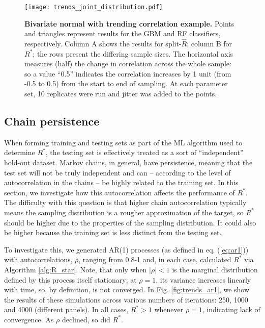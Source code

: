 \documentclass{article}
\begin{document}
\begin{figure}[!htb]
	\centerline{\texttt{[image: trends\_joint\_distribution.pdf]}}
	\caption{\textbf{Bivariate normal with trending correlation example.} Points and triangles represent results for the GBM and RF classifiers, respectively. Column A shows the results for split-$\widehat{R}$; column B for $R^*$; the rows present the differing sample sizes. The horizontal axis measures (half) the change in correlation across the whole sample: so a value ``0.5'' indicates the correlation increases by 1 unit (from -0.5 to 0.5) from the start to end of sampling. At each parameter set, 10 replicates were run and jitter was added to the points.}
	\label{fig:trends_joint_distribution}
\end{figure}

\subsection{Chain persistence}\label{sec:non-stationary_persistence}
When forming training and testing sets as part of the ML algorithm used to determine $R^*$, the testing set is effectively treated as a sort of ``independent'' hold-out dataset. Markov chains, in general, have persistence, meaning that the test set will not be truly independent and can -- according to the level of autocorrelation in the chains -- be highly related to the training set. In this section, we investigate how this autocorrelation affects the performance of $R^*$. The difficulty with this question is that higher chain autocorrelation typically means the sampling distribution is a rougher approximation of the target, so $R^*$ should be higher due to the properties of the sampling distribution. It could also be higher because the training set is less distinct from the testing set.

To investigate this, we generated AR(1) processes (as defined in eq. (\ref{eq:ar1})) with autocorrelations, $\rho$, ranging from 0.8-1 and, in each case, calculated $R^*$ via Algorithm \ref{alg:R_star}. Note, that only when $|\rho|<1$ is the marginal distribution defined by this process itself stationary; at $\rho=1$, its variance increases linearly with time, so, by definition, is not converged. In Fig. \ref{fig:trends_ar1}, we show the results of these simulations across various numbers of iterations: 250, 1000 and 4000 (different panels). In all cases, $R^*>1$ whenever $\rho=1$, indicating lack of convergence. As $\rho$ declined, so did $R^*$.
\end{document}
